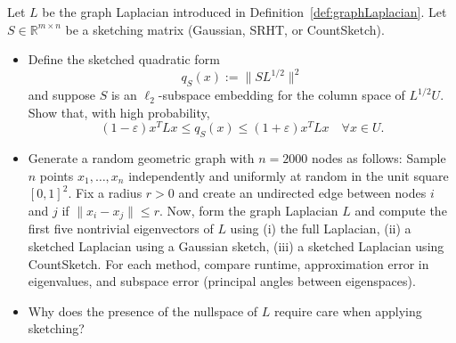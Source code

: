 \begin{myexercise}
Let $L$ be the graph Laplacian introduced in Definition~\ref{def:graphLaplacian}. 
Let $S \in \mathbb{R}^{m \times n}$ be a sketching matrix (Gaussian, SRHT, or CountSketch).
\begin{itemize}
\item[(a)] 
Define the sketched quadratic form
$$
q_S(x) := \|S L^{1/2} \|^2
$$
and suppose $S$ is an $\ell_2$-subspace embedding for the column space of $L^{1/2} U$.
Show that, with high probability,
$$
   (1-\varepsilon) x^T L x \le q_S(x) \le (1+\varepsilon) x^T L x
   \quad \forall x \in U.
$$

\item[(b)] Generate a random geometric graph with $n = 2000$ nodes  as follows: Sample $n$ points $x_1,\dots,x_n$ independently and uniformly at random in the unit square $[0,1]^2$. Fix a radius $r>0$ and create an undirected edge between nodes $i$ and $j$ if $\|x_i - x_j\| \le r$.
Now, form the graph Laplacian $L$ and
compute the first five nontrivial eigenvectors of $L$ using (i) the full Laplacian, (ii) a sketched Laplacian using a Gaussian sketch, (iii) a sketched Laplacian using CountSketch. For each method, compare runtime, approximation error in eigenvalues,
and subspace error (principal angles between eigenspaces). 
\item[(c)] Why does the presence of the nullspace of $L$ require care when applying sketching?
\end{itemize}

    
\end{myexercise}

